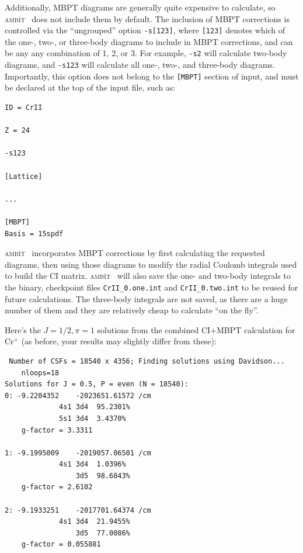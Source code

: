 \documentclass{report}
\newcommand{\ambit}{\textsc{amb}{\footnotesize i}\textsc{t}}
\begin{document}
Additionally, MBPT diagrams are generally quite expensive to calculate, so \ambit~ does not include them
by default. The inclusion of MBPT corrections is controlled via the ``ungrouped'' option
\texttt{-s[123]}, where \texttt{[123]} denotes which of the one-, two-, or three-body diagrams to 
include in MBPT corrections, and can be any any combination of 1, 2, or 3. For example, \texttt{-s2} 
will calculate two-body diagrams, and \texttt{-s123} will calculate all one-, two-, and three-body 
diagrams. Importantly, this option does not belong to the \texttt{[MBPT]} section of input, and must be
declared at the top of the input file, such as:

\begin{verbatim}
ID = CrII

Z = 24

-s123

[Lattice]

...

[MBPT]
Basis = 15spdf
\end{verbatim}

\ambit~ incorporates MBPT corrections by first calculating the requested diagrams, then using those
diagrams to modify the radial Coulomb integrals used to build the CI matrix. \ambit~ will also save the
one- and two-body integrals to the binary, checkpoint files \texttt{CrII\_0.one.int} and
\texttt{CrII\_0.two.int} to be reused for future calculations. The three-body integrals are not saved,
as there are a huge number of them and they are relatively cheap to calculate ``on the fly''.

Here's the $J = 1/2, \pi = 1$ solutions from the combined CI+MBPT calculation for Cr$^+$ (as before, 
your results may slightly differ from these):

\begin{verbatim}
 Number of CSFs = 18540 x 4356; Finding solutions using Davidson...
    nloops=18
Solutions for J = 0.5, P = even (N = 18540):
0: -9.2204352    -2023651.61572 /cm
             4s1 3d4  95.2301%
             5s1 3d4  3.4370%
    g-factor = 3.3311

1: -9.1995009    -2019057.06501 /cm
             4s1 3d4  1.0396%
                 3d5  98.6843%
    g-factor = 2.6102

2: -9.1933251    -2017701.64374 /cm
             4s1 3d4  21.9455%
                 3d5  77.0086%
    g-factor = 0.055881
\end{verbatim}
\end{document}
